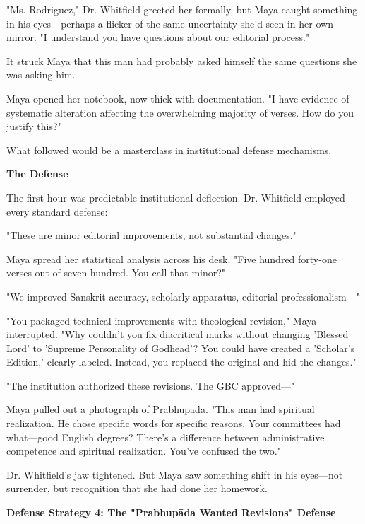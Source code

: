\documentclass[12pt,twoside]{book}
\begin{document}
"Ms. Rodriguez," Dr. Whitfield greeted her formally, but Maya caught something in his eyes—perhaps a flicker of the same uncertainty she'd seen in her own mirror. "I understand you have questions about our editorial process."

It struck Maya that this man had probably asked himself the same questions she was asking him.

Maya opened her notebook, now thick with documentation. "I have evidence of systematic alteration affecting the overwhelming majority of verses. How do you justify this?"

What followed would be a masterclass in institutional defense mechanisms.


\vspace{0.5cm}
\textbf{The Defense}
\vspace{0.2cm}


The first hour was predictable institutional deflection. Dr. Whitfield employed every standard defense:

"These are minor editorial improvements, not substantial changes."

Maya spread her statistical analysis across his desk. "Five hundred forty-one verses out of seven hundred. You call that minor?"

"We improved Sanskrit accuracy, scholarly apparatus, editorial professionalism—"

"You packaged technical improvements with theological revision," Maya interrupted. "Why couldn't you fix diacritical marks without changing 'Blessed Lord' to 'Supreme Personality of Godhead'? You could have created a 'Scholar's Edition,' clearly labeled. Instead, you replaced the original and hid the changes."

"The institution authorized these revisions. The GBC approved—"

Maya pulled out a photograph of Prabhupāda. "This man had spiritual realization. He chose specific words for specific reasons. Your committees had what—good English degrees? There's a difference between administrative competence and spiritual realization. You've confused the two."

Dr. Whitfield's jaw tightened. But Maya saw something shift in his eyes—not surrender, but recognition that she had done her homework.


\vspace{0.5cm}
\textbf{Defense Strategy 4: The "Prabhupāda Wanted Revisions" Defense}
\vspace{0.2cm}
\end{document}
